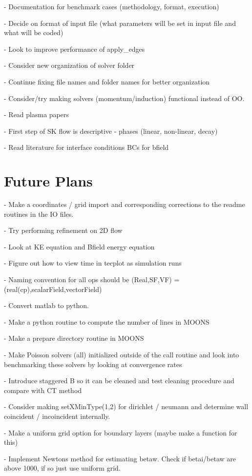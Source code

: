 \documentclass[11pt]{article}
\begin{document}
- Documentation for benchmark cases (methodology, format, execution)

- Decide on format of input file (what parameters will be set in input file and what will be coded)

- Look to improve performance of apply\_edges

- Consider new organization of solver folder

- Continue fixing file names and folder names for better organization

- Consider/try making solvers (momentum/induction) functional instead of OO.

- Read plasma papers

- First step of SK flow is descriptive - phases (linear, non-linear, decay)

- Read literature for interface conditions BCs for bfield

\section{Future Plans}

- Make a coordinates / grid import and corresponding corrections to the readme routines in the IO files.

- Try performing refinement on 2D flow

- Look at KE equation and Bfield energy equation

- Figure out how to view time in tecplot as simulation runs

- Naming convention for all ops should be (Real,SF,VF) = (real(cp),scalarField,vectorField)

- Convert matlab to python.

- Make a python routine to compute the number of lines in MOONS

- Make a prepare directory routine in MOONS

- Make Poisson solvers (all) initialized outside of the call routine and look into benchmarking these solvers by looking at convergence rates

- Introduce staggered B so it can be cleaned and test cleaning procedure and compare with CT method

- Consider making setXMinType(1,2) for dirichlet / neumann and determine wall coincident / incoincident internally.

- Make a uniform grid option for boundary layers (maybe make a function for this)

- Implement Newtons method for estimating betaw. Check if betai/betaw
are above 1000, if so just use uniform grid.
\end{document}
